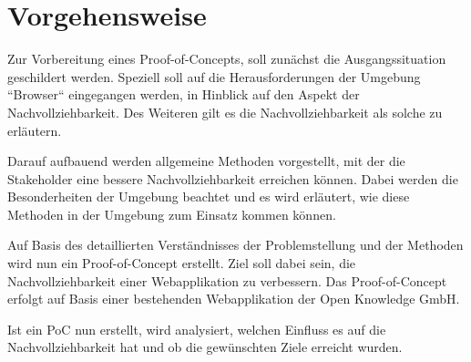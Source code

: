 \pagebreak

\section{Vorgehensweise}

Zur Vorbereitung eines Proof-of-Concepts, soll zunächst die Ausgangssituation geschildert werden. Speziell soll auf die Herausforderungen der Umgebung ``Browser`` eingegangen werden, in Hinblick auf den Aspekt der Nachvollziehbarkeit. Des Weiteren gilt es die Nachvollziehbarkeit als solche zu erläutern.



Darauf aufbauend werden allgemeine Methoden vorgestellt, mit der die Stakeholder eine bessere Nachvollziehbarkeit erreichen können. Dabei werden die Besonderheiten der Umgebung beachtet und es wird erläutert, wie diese Methoden in der Umgebung zum Einsatz kommen können.


Auf Basis des detaillierten Verständnisses der Problemstellung und der Methoden wird nun ein Proof-of-Concept erstellt. Ziel soll dabei sein, die Nachvollziehbarkeit einer Webapplikation zu verbessern. Das Proof-of-Concept erfolgt auf Basis einer bestehenden Webapplikation der Open Knowledge GmbH. 

Ist ein PoC nun erstellt, wird analysiert, welchen Einfluss es auf die Nachvollziehbarkeit hat und ob die gewünschten Ziele erreicht wurden.

